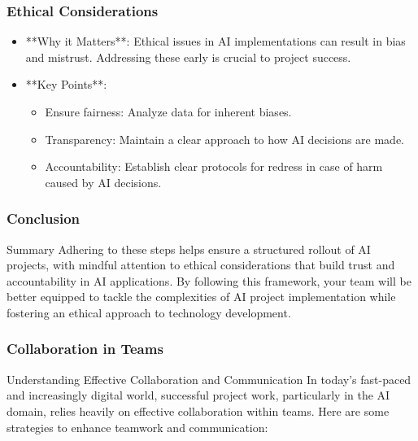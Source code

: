 \documentclass[aspectratio=169]{beamer}
\begin{document}
\begin{frame}
    \frametitle{Ethical Considerations}
    \begin{itemize}
        \item **Why it Matters**: Ethical issues in AI implementations can result in bias and mistrust. Addressing these early is crucial to project success.
        \item **Key Points**:
            \begin{itemize}
                \item Ensure fairness: Analyze data for inherent biases.
                \item Transparency: Maintain a clear approach to how AI decisions are made.
                \item Accountability: Establish clear protocols for redress in case of harm caused by AI decisions.
            \end{itemize}
    \end{itemize}
\end{frame}

\begin{frame}
    \frametitle{Conclusion}
    \begin{block}{Summary}
        Adhering to these steps helps ensure a structured rollout of AI projects, with mindful attention to ethical considerations that build trust and accountability in AI applications. By following this framework, your team will be better equipped to tackle the complexities of AI project implementation while fostering an ethical approach to technology development.
    \end{block}
\end{frame}

\begin{frame}[fragile]
    \frametitle{Collaboration in Teams}
    \begin{block}{Understanding Effective Collaboration and Communication}
        In today's fast-paced and increasingly digital world, successful project work, particularly in the AI domain, relies heavily on effective collaboration within teams. Here are some strategies to enhance teamwork and communication:
    \end{block}
\end{frame}
\end{document}
